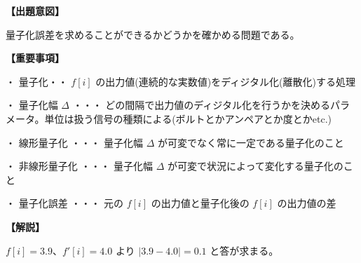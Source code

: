 \noindent \textbf{【出題意図】}

\noindent 量子化誤差を求めることができるかどうかを確かめる問題である。

\vspace{1em}
\noindent \textbf{【重要事項】}

\medskip
\noindent ・ 量子化・・ $f[i]$ の出力値(連続的な実数値)をディジタル化(離散化)する処理

\medskip
\noindent ・ 量子化幅 $\Delta$ ・・・ どの間隔で出力値のディジタル化を行うかを決めるパラメータ。単位は扱う信号の種類による(ボルトとかアンペアとか度とかetc.)

\medskip
\noindent ・ 線形量子化 ・・・ 量子化幅  $\Delta$ が可変でなく常に一定である量子化のこと

\medskip
\noindent ・ 非線形量子化 ・・・ 量子化幅  $\Delta$ が可変で状況によって変化する量子化のこと

\medskip
\noindent ・ 量子化誤差 ・・・ 元の $f[i]$ の出力値と量子化後の $f[i]$ の出力値の差

\vspace{1em}
\noindent \textbf{【解説】}

\noindent $f[i] = 3.9$、$f'[i]=4.0$ より $|3.9-4.0| =0.1$ と答が求まる。
